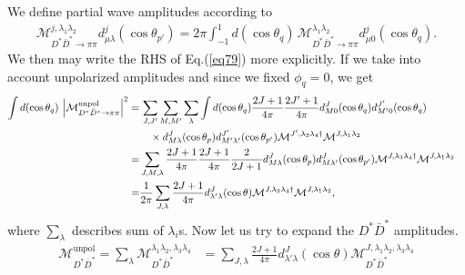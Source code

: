 \documentclass[aps,prd,preprintnumbers,showpacs,showkeys,nofootinbib,
superscriptaddress,fleqn,floatfix,tightenlines, 10pt]{revtex4-1}
\begin{document}
We define partial wave amplitudes according to
\begin{align}
	\mathcal{M}_{D^* \bar{D}^* \rightarrow \pi\pi}^{j,\lambda_1 \lambda_2}
	d_{\mu\lambda}^j(\cos{\theta_{p'}})
	= 2\pi \int_{-1}^{1} d(\cos{\theta_q})
	\,\mathcal{M}_{D^* \bar{D}^* \rightarrow \pi\pi}^{\lambda_1 \lambda_2}
	d_{\mu0}^j(\cos{\theta_q}).
\end{align}
We then may write the RHS of Eq.(\ref{eq79}) more explicitly. If we take into
account unpolarized amplitudes and since we fixed $\phi_q=0$, we get
\begin{align} \label{D*D*barpipi_combining}
	\int d(\cos{\theta_q})\, \left|\mathcal{M}_{D^*\bar{D}^*\rightarrow\pi\pi}^{\mathrm{unpol}}\right|^2
	= &\,\sum_{J,J'}\sum_{M,M'}\sum_{\lambda} \int d(\cos{\theta_q})
	\frac{2J+1}{4\pi} \frac{2J'+1}{4\pi}
	d_{M0}^J(\cos{\theta_q}) d_{M'0}^{J'}(\cos{\theta_q}) \cr
	& \quad \times d_{M\lambda}^J(\cos{\theta_p}) d_{M'\lambda'}^{J'}(\cos{\theta_{p'}})
	\mathcal{M}^{J',\lambda_3 \lambda_4 \dagger} \mathcal{M}^{J,\lambda_1 \lambda_2} \cr
	= &\sum_{J,M,\lambda} \frac{2J+1}{4\pi} \frac{2J+1}{4\pi} \frac{2}{2J+1}
	d_{M\lambda}^J(\cos{\theta_p}) d_{M\lambda'}^{J}(\cos{\theta_{p'}})
	\mathcal{M}^{J,\lambda_3 \lambda_4 \dagger} \mathcal{M}^{J,\lambda_1 \lambda_2} \cr
	= & \frac{1}{2\pi} \sum_{J,\lambda} \frac{2J+1}{4\pi} d_{\lambda' \lambda}^J(\cos{\theta})
	\mathcal{M}^{J,\lambda_3 \lambda_4 \dagger} \mathcal{M}^{J,\lambda_1 \lambda_2},
\end{align}
where $\sum_{\lambda}$ describes sum of $\lambda_i$s.
Now let us try to expand the $D^* \bar{D}^*$ amplitudes.
\begin{align} \label{D*D*bar_expansion}
	\mathcal{M}_{D^* \bar{D}^*}^{\mathrm{unpol}} = \sum_{\lambda}
	\mathcal{M}_{D^* \bar{D}^*}^{\lambda_1 \lambda_2, \lambda_3 \lambda_4} &=
	\sum_{J,\lambda} \frac{2J+1}{4\pi} d_{\lambda' \lambda}^J(\cos{\theta})
	\mathcal{M}_{D^* \bar{D}^*}^{J,\lambda_1 \lambda_2, \lambda_3 \lambda_4}
\end{align}
\end{document}
